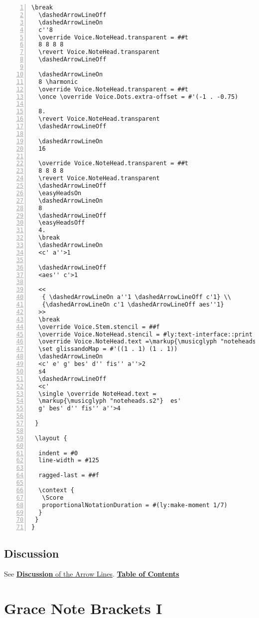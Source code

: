 \begin{Verbatim}[numbers=left,xleftmargin=5mm]
  \break
  \dashedArrowLineOff
  \dashedArrowLineOn
  c''8
  \override Voice.NoteHead.transparent = ##t
  8 8 8 8
  \revert Voice.NoteHead.transparent
  \dashedArrowLineOff

  \dashedArrowLineOn
  8 \harmonic
  \override Voice.NoteHead.transparent = ##t
  \once \override Voice.Dots.extra-offset = #'(-1 . -0.75)

  8.
  \revert Voice.NoteHead.transparent
  \dashedArrowLineOff

  \dashedArrowLineOn
  16

  \override Voice.NoteHead.transparent = ##t
  8 8 8 8
  \revert Voice.NoteHead.transparent
  \dashedArrowLineOff
  \easyHeadsOn
  \dashedArrowLineOn
  8
  \dashedArrowLineOff
  \easyHeadsOff
  4.
  \break
  \dashedArrowLineOn
  <c' a''>1

  \dashedArrowLineOff
  <aes'' c'>1

  <<
   { \dashedArrowLineOn a''1 \dashedArrowLineOff c'1} \\
   {\dashedArrowLineOn c'1 \dashedArrowLineOff aes''1}
  >>
  \break
  \override Voice.Stem.stencil = ##f
  \override Voice.NoteHead.stencil = #ly:text-interface::print
  \override Voice.NoteHead.text =\markup{\musicglyph "noteheads.s1"}
  \set glissandoMap = #'((1 . 1) (1 . 1))
  \dashedArrowLineOn
  <c' e' g' bes' d'' fis'' a''>2
  s4
  \dashedArrowLineOff
  <c'
  \single \override NoteHead.text =
  \markup{\musicglyph "noteheads.s2"}  es'
  g' bes' d'' fis'' a''>4

 }

 \layout {

  indent = #0
  line-width = #125

  ragged-last = ##f

  \context {
   \Score
   proportionalNotationDuration = #(ly:make-moment 1/7)
  }
 }
}
\end{Verbatim}
\subsection{Discussion}
See \hyperref[sec:arrow_lines_discussion]{\textbf{Discussion} of the Arrow Lines}.
\hyperref[sec:toc]{\textbf{Table of Contents}}

\vfill \break








\section {Grace Note Brackets I}
\hfill
{}
\hfill

